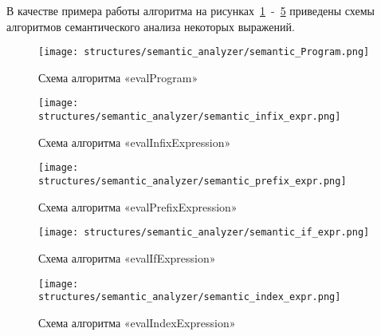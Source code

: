В качестве примера работы алгоритма на рисунках~\ref{f:evalProgram}~-~\ref{f:semantic_index_expr} приведены схемы алгоритмов семантического анализа некоторых выражений.


\clearpage

\begin{figure}[!htp]
	\centering
	\texttt{[image: structures/semantic\_analyzer/semantic\_Program.png]}
	\caption{Схема алгоритма «evalProgram»}
	\label{f:evalProgram}
\end{figure}

\clearpage

\begin{figure}[!htp]
	\centering
	\texttt{[image: structures/semantic\_analyzer/semantic\_infix\_expr.png]}
	\caption{Схема алгоритма «evalInfixExpression»}
	\label{f:semantic_infix_expr}
\end{figure}

\clearpage

\begin{figure}[!htp]
	\centering
	\texttt{[image: structures/semantic\_analyzer/semantic\_prefix\_expr.png]}
	\caption{Схема алгоритма «evalPrefixExpression»}
	\label{f:semantic_prefix_expr}
\end{figure}

\clearpage

\begin{figure}[!htp]
	\centering
	\texttt{[image: structures/semantic\_analyzer/semantic\_if\_expr.png]}
	\caption{Схема алгоритма «evalIfExpression»}
	\label{f:semantic_if_expr}
\end{figure}

\clearpage

\begin{figure}[!htp]
	\centering
	\texttt{[image: structures/semantic\_analyzer/semantic\_index\_expr.png]}
	\caption{Схема алгоритма «evalIndexExpression»}
	\label{f:semantic_index_expr}
\end{figure}
